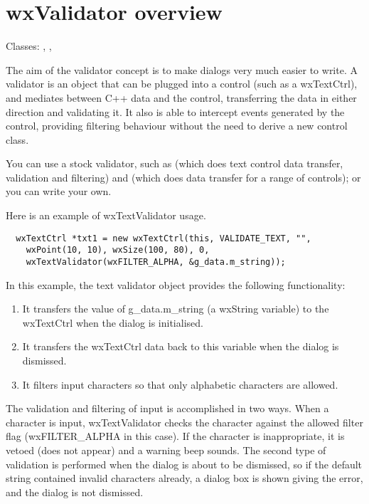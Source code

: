 \section{wxValidator overview}\label{validatoroverview}

Classes: , , 

The aim of the validator concept is to make dialogs very much easier to write.
A validator is an object that can be plugged into a control (such as a wxTextCtrl), and
mediates between C++ data and the control, transferring the data in either direction
and validating it. It also is able to intercept events generated
by the control, providing filtering behaviour without the need to derive a new control class.

You can use a stock validator, such as  (which does text
control data transfer, validation and filtering) and 
 (which does data transfer for a range of controls);
or you can write your own.


Here is an example of wxTextValidator usage.

\begin{verbatim}
  wxTextCtrl *txt1 = new wxTextCtrl(this, VALIDATE_TEXT, "",
    wxPoint(10, 10), wxSize(100, 80), 0,
    wxTextValidator(wxFILTER_ALPHA, &g_data.m_string));
\end{verbatim}

In this example, the text validator object provides the following functionality:

\begin{enumerate}\itemsep=0pt
\item It transfers the value of g\_data.m\_string (a wxString variable) to the wxTextCtrl when
the dialog is initialised.
\item It transfers the wxTextCtrl data back to this variable when the dialog is dismissed.
\item It filters input characters so that only alphabetic characters are allowed.
\end{enumerate}

The validation and filtering of input is accomplished in two ways. When a character is input,
wxTextValidator checks the character against the allowed filter flag (wxFILTER\_ALPHA in this case). If
the character is inappropriate, it is vetoed (does not appear) and a warning beep sounds.
The second type of validation is performed when the dialog is about to be dismissed, so if
the default string contained invalid characters already, a dialog box is shown giving the
error, and the dialog is not dismissed.

